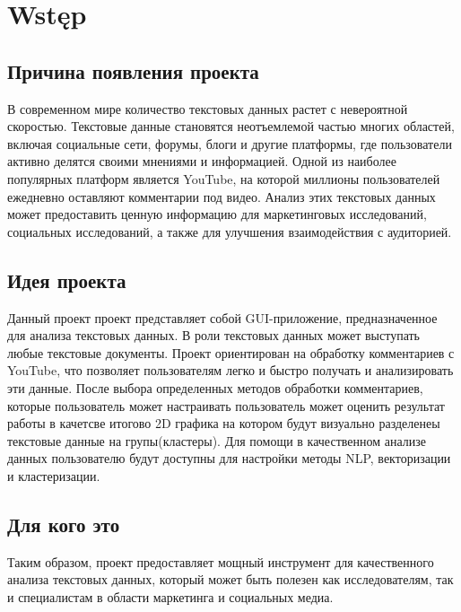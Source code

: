 \chapter*{Wstęp}
\section{Причина появления проекта}
	В современном мире количество текстовых данных растет с невероятной скоростью. Текстовые данные становятся неотъемлемой частью многих областей, включая социальные сети, форумы, блоги и другие платформы, где пользователи активно делятся своими мнениями и информацией. Одной из наиболее популярных платформ является YouTube, на которой миллионы пользователей ежедневно оставляют комментарии под видео. Анализ этих текстовых данных может предоставить ценную информацию для маркетинговых исследований, социальных исследований, а также для улучшения взаимодействия с аудиторией.

\section{Идея проекта}
 	Данный проект проект представляет собой GUI-приложение, предназначенное для анализа текстовых данных. В роли текстовых данных может выступать любые текстовые документы. Проект ориентирован на обработку комментариев с YouTube, что позволяет пользователям легко и быстро получать и анализировать эти данные. После выбора определенных методов обработки комментариев, которые пользователь может настраивать пользователь может оценить результат работы в качетсве итогово 2D графика на котором будут визуально разделенеы текстовые данные на групы(кластеры). Для помощи в качественном анализе данных пользователю будут доступны для настройки методы NLP, векторизации и кластеризации. 
 
 \section{Для кого это}
 	Таким образом, проект предоставляет мощный инструмент для качественного анализа текстовых данных, который может быть полезен как исследователям, так и специалистам в области маркетинга и социальных медиа.

